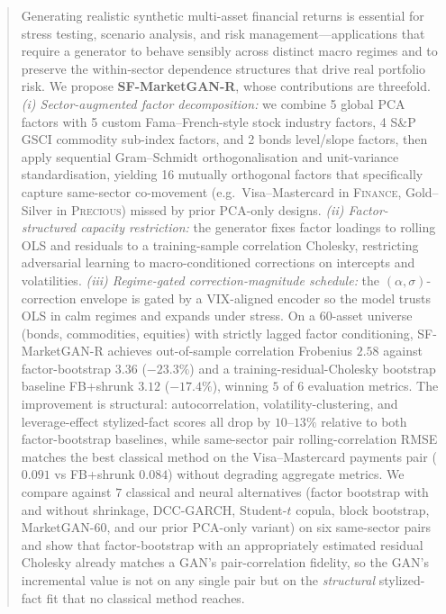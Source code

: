 \begin{abstract}
Generating realistic synthetic multi-asset financial returns is essential for stress testing, scenario analysis, and risk management---applications that require a generator to behave sensibly across distinct macro regimes and to preserve the within-sector dependence structures that drive real portfolio risk.
We propose \textbf{SF-MarketGAN-R}, whose contributions are threefold. \emph{(i) Sector-augmented factor decomposition:} we combine 5 global PCA factors with 5 custom Fama--French-style stock industry factors, 4 S\&P GSCI commodity sub-index factors, and 2 bonds level/slope factors, then apply sequential Gram--Schmidt orthogonalisation and unit-variance standardisation, yielding 16 mutually orthogonal factors that specifically capture same-sector co-movement (e.g.\ Visa--Mastercard in \textsc{Finance}, Gold--Silver in \textsc{Precious}) missed by prior PCA-only designs. \emph{(ii) Factor-structured capacity restriction:} the generator fixes factor loadings to rolling OLS and residuals to a training-sample correlation Cholesky, restricting adversarial learning to macro-conditioned corrections on intercepts and volatilities. \emph{(iii) Regime-gated correction-magnitude schedule:} the $(\alpha, \sigma)$-correction envelope is gated by a VIX-aligned encoder so the model trusts OLS in calm regimes and expands under stress.
On a 60-asset universe (bonds, commodities, equities) with strictly lagged factor conditioning, SF-MarketGAN-R achieves out-of-sample correlation Frobenius $2.58$ against factor-bootstrap $3.36$ ($-23.3\%$) and a training-residual-Cholesky bootstrap baseline FB+shrunk $3.12$ ($-17.4\%$), winning $5$ of $6$ evaluation metrics. The improvement is structural: autocorrelation, volatility-clustering, and leverage-effect stylized-fact scores all drop by $10$--$13\%$ relative to both factor-bootstrap baselines, while same-sector pair rolling-correlation RMSE matches the best classical method on the Visa--Mastercard payments pair ($0.091$ vs FB+shrunk $0.084$) without degrading aggregate metrics.
We compare against $7$ classical and neural alternatives (factor bootstrap with and without shrinkage, DCC-GARCH, Student-$t$ copula, block bootstrap, MarketGAN-60, and our prior PCA-only variant) on six same-sector pairs and show that factor-bootstrap with an appropriately estimated residual Cholesky already matches a GAN's pair-correlation fidelity, so the GAN's incremental value is not on any single pair but on the \emph{structural} stylized-fact fit that no classical method reaches.
\end{abstract}
